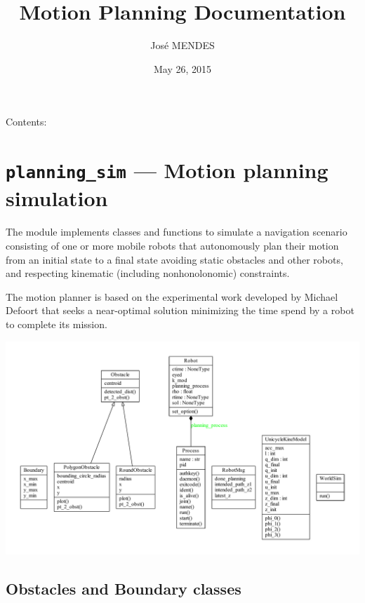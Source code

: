 \documentclass[letterpaper,10pt,english]{sphinxmanual}
\title{Motion Planning Documentation}
\date{May 26, 2015}
\author{José MENDES}
\begin{document}
\maketitle
\tableofcontents
{}\label{index::doc}


Contents:


\chapter{\texttt{planning\_sim} --- Motion planning simulation}
\label{Multi-robot motion planner:planning-sim-motion-planning-simulation}\label{Multi-robot motion planner::doc}\label{Multi-robot motion planner:logo-welcome-to-motion-planning-s-documentation}\label{Multi-robot motion planner:module-planning_sim}
The {\hyperref[Multi-robot motion planner:module-planning_sim]{}} module implements classes and functions to simulate a
navigation scenario consisting of one or more mobile robots that autonomously plan their
motion from an initial state to a final state avoiding static obstacles and
other robots, and respecting kinematic (including nonhonolonomic) constraints.

The motion planner is based on the experimental work developed by Michael Defoort
that seeks a near-optimal solution minimizing the time spend by a robot to
complete its mission.

\includegraphics{graphviz-f5a2dbd6e20395848fd36bdccb5a5c0c877dd286.pdf}


\section{Obstacles and Boundary classes}
\label{Multi-robot motion planner:obstacles-and-boundary-classes}
\begin{DUlineblock}{0em}
\item[] 
\end{DUlineblock}
\end{document}
